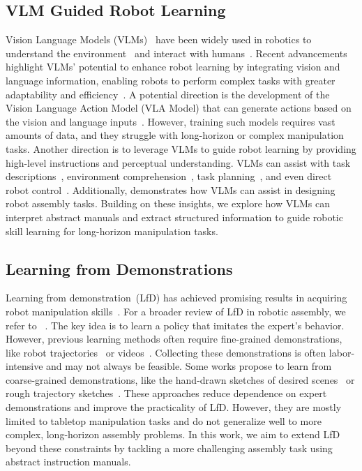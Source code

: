 \subsection{VLM Guided Robot Learning}
Vision Language Models (VLMs)~\citep{yin2023survey} have been widely used in robotics to understand the environment~\citep{huang2024copa} and interact with humans~\citep{shi2024yell}.
Recent advancements highlight VLMs' potential to enhance robot learning by integrating vision and language information, enabling robots to perform complex tasks with greater adaptability and efficiency~\cite {huang2024rekep}.
A potential direction is the development of the Vision Language Action Model (VLA Model) that can generate actions based on the vision and language inputs~\citep{black2024pi_0,kim2024openvla,brohan2023rt,team2024octo}.
However, training such models requires vast amounts of data, and they struggle with long-horizon or complex manipulation tasks.
Another direction is to leverage VLMs to guide robot learning by providing high-level instructions and perceptual understanding. VLMs can assist with task descriptions~\citep{huang2024copa,huang2024rekep}, environment comprehension~\citep{jiang2024roboexp}, task planning~\citep{vemprala2024chatgpt,yao2022react,zhao2024large}, and even direct robot control~\citep{li2024manipllm}.
Additionally, \citet{goldberg2024blox} demonstrates how VLMs can assist in designing robot assembly tasks. Building on these insights, we explore how VLMs can interpret abstract manuals and extract structured information to guide robotic skill learning for long-horizon manipulation tasks.


\subsection{Learning from Demonstrations}
Learning from demonstration~(LfD) has achieved promising results in acquiring robot manipulation skills~\citep{fu2024mobile,zhu2023viola,chi2023diffusion}. For a broader review of LfD in robotic assembly, we refer to ~\citet{zhu2018robot}.
The key idea is to learn a policy that imitates the expert's behavior.
However, previous learning methods often require fine-grained demonstrations, like robot trajectories~\citep{chi2023diffusion} or videos~\citep{kareer2024egomimic,sontakke2024roboclip,jonnavittula2024view}.
Collecting these demonstrations is often labor-intensive and may not always be feasible.
Some works propose to learn from coarse-grained demonstrations, like the hand-drawn sketches of desired scenes~\citep{sundaresan2024rt} or rough trajectory sketches~\citep{gu2023rt}.
These approaches reduce dependence on expert demonstrations and improve the practicality of LfD. However, they are mostly limited to tabletop manipulation tasks and do not generalize well to more complex, long-horizon assembly problems.
In this work, we aim to extend LfD beyond these constraints by tackling a more challenging assembly task using abstract instruction manuals. 